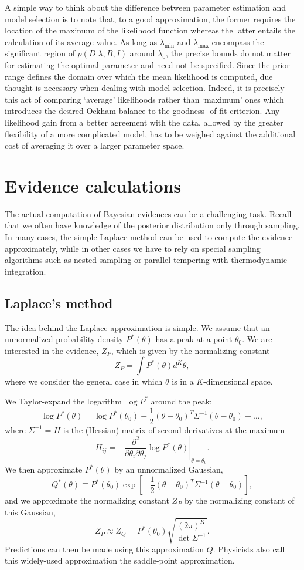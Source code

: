 \documentclass[%
oneside,                 %
final,                   %
10pt]{article}
\begin{document}
A simple way to think about the difference between parameter estimation and model selection is to note that, to a good approximation, the former requires the location of the maximum of the likelihood function whereas the latter entails the calculation of its average value. As long as $\lambda_\mathrm{min}$ and $\lambda_\mathrm{max}$ encompass the significant region of $p(D|\lambda,B,I)$ around $\lambda_0$, the precise bounds do not matter for estimating the optimal parameter and need not be specified. Since the prior range defines the domain over which the mean likelihood is computed, due thought is necessary when dealing with model selection. Indeed, it is precisely this act of comparing ‘average’ likelihoods rather than ‘maximum’ ones which introduces the desired Ockham balance to the goodness- of-fit criterion. Any likelihood gain from a better agreement with the data, allowed by the greater flexibility of a more complicated model, has to be weighed against the additional cost of averaging it over a larger parameter space.

\section{Evidence calculations}
The actual computation of Bayesian evidences can be a challenging task. Recall that we often have knowledge of the posterior distribution only through sampling. In many cases, the simple Laplace method can be used to compute the evidence approximately, while in other cases we have to rely on special sampling algorithms such as nested sampling or parallel tempering with thermodynamic integration.

\subsection{Laplace's method}
The idea behind the Laplace approximation is simple. We assume that an unnormalized probability density $P^*(\theta)$ has a peak at a point $\theta_0$. We are interested in the evidence, $Z_P$, which is given by the normalizing constant
$$
Z_P = \int P^*(\theta) d^K\theta,
$$ 
where we consider the general case in which $\theta$ is in a $K$-dimensional space. 

We Taylor-expand the logarithm $\log P^*$ around the peak:
$$
\log P^*(\theta) = \log P^*(\theta_0) - \frac{1}{2} (\theta - \theta_0)^T \Sigma^{-1} (\theta - \theta_0) + \ldots,
$$
where $\Sigma^{-1} = H$ is the (Hessian) matrix of second derivatives at the maximum
$$
H_{ij} = - \left. \frac{\partial^2}{\partial \theta_i \partial \theta_j}  \log P^*(\theta)\right|_{\theta=\theta_0}.
$$
We then approximate $P^*(\theta)$ by an unnormalized Gaussian, 
$$
Q^*(\theta) \equiv P^*(\theta_0) \exp \left[ - \frac{1}{2}(\theta - \theta_0)^T \Sigma^{-1} (\theta - \theta_0) \right],
$$
and we approximate the normalizing constant $Z_P$ by the normalizing constant
of this Gaussian,
$$
Z_P \approx Z_Q = P^*(\theta_0) \sqrt{\frac{(2\pi)^K}{\det\Sigma^{-1}}}.
$$
Predictions can then be made using this approximation $Q$. Physicists also call this widely-used approximation the saddle-point approximation.
\end{document}
